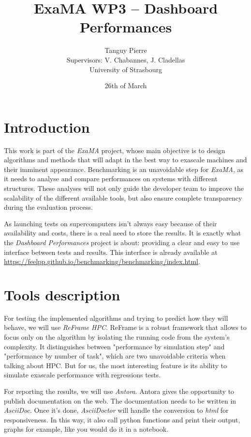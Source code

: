 \documentclass[12pt]{article}
\title{\textbf{ExaMA WP3 -- Dashboard Performances}}
\author{Tanguy Pierre\\[0.5cm]
            Supervisors: V. Chabannes, J. Cladellas\\[1cm]
            University of Strasbourg}
\date{26th of March}
\begin{document}
    \maketitle

\newpage
\tableofcontents


\newpage
\section{Introduction}

This work is part of the \textit{ExaMA} project, whose main objective is to design algorithms and methods
that will adapt in the best way to exascale machines and their imminent appearance.\newline
Benchmarking is an unavoidable step for \textit{ExaMA}, as it needs to analyse and compare performances on systems
with different structures. These analyses will not only guide the developer team to improve the scalability of the different available tools,
but also ensure complete transparency during the evaluation process.

As launching tests on supercomputers isn't always easy because of their availability and costs, there is a real need to store the results.
It is exactly what the \textit{Dashboard Performances} project is about: providing a clear and easy to use interface between tests and results.
This interface is already available at \url{https://feelpp.github.io/benchmarking/benchmarking/index.html}.


\section{Tools description}

For testing the implemented algorithms and trying to predict how they will behave, we will use \textit{ReFrame HPC}\cite*{ReFrame}.
ReFrame is a robust framework that allows to focus only on the algorithm by isolating the running code from the system's complexity.
It distinguishes between "performance by simulation step" and "performance by number of task", which are two unavoidable criteria when talking about HPC.
But for us, the most interesting feature is its ability to simulate exascale performance with regressions tests.

For reporting the results, we will use \textit{Antora}\cite*{Antora}. Antora gives the opportunity to publish documentation on the web.
The documentation needs to be written in \textit{AsciiDoc}. Once it's done, \textit{AsciiDoctor} will handle the conversion to \textit{html}
for responsiveness.
In this way, it also call python functions and print their output, graphs for example, like you would do it in a notebook.
\end{document}
